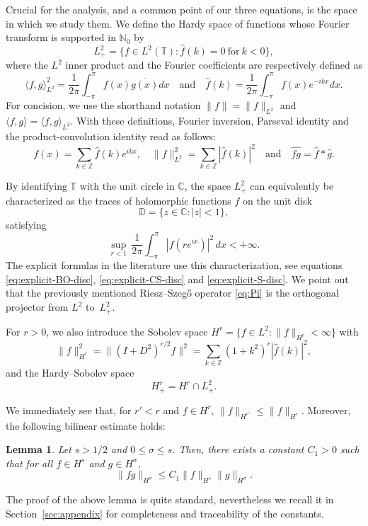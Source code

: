 \documentclass [11pt] {article}
\newtheorem{lem}[thm]{Lemma}
\begin{document}
Crucial for the analysis, and a common point of our three equations, is the space in which we study them. We define the Hardy space of functions whose Fourier transform is supported in $\mathbb N_0$ by
\begin{equation}
\label{eq:Hardy}
L^2_{+} = \{f\in L^2(\mathbb{T}) : \widehat{f}(k) = 0 \ \text{for} \ k<0 \},
\end{equation}
where the $L^2$ inner product and the Fourier coefficients are respectively defined as
\[
\langle f,g\rangle_{L^2}^2=\frac{1}{2\pi}\int_{-\pi}^\pi f(x)\overline{g(x)}dx\quad\text{and}\quad \widehat f(k)=\frac{1}{2\pi}\int_{-\pi}^\pi f(x)e^{-ikx}dx.
\]
For concision, we use the shorthand notation $\|f\|=\|f\|_{L^2}$ and $\langle f,g\rangle=\langle f,g\rangle_{L^2}$. With these definitions, Fourier inversion, Parseval identity and the product-convolution identity read as follows:
\[
f(x)=\sum_{k\in\mathbb Z}\widehat f(k) e^{ikx},\quad \|f\|_{L^2}^2=\sum_{k\in \mathbb Z} |\widehat f(k)|^2\quad\text{and}\quad \widehat{fg}=\widehat f*\widehat g.
\]

By identifying $\mathbb T$ with the unit circle in $\mathbb C$, the space $L^2_+$ can equivalently be characterized as the traces of holomorphic functions $f$ on the unit disk
\[
\mathbb{D} = \{z\in \mathbb{C} : |z| <1 \},
\]
satisfying
\[
\sup_{r<1}\,\frac{1}{2\pi}\int_{-\pi}^{\pi} |f(re^{ix})|^2\,dx < + \infty.
\]
The explicit formulas in the literature use this characterization, see equations \eqref{eq:explicit-BO-disc}, \eqref{eq:explicit-CS-disc} and \eqref{eq:explicit-S-disc}.
We point out that the previously mentioned Riesz–Szeg\H o operator \eqref{eq:Pi} is the orthogonal projector from $L^2$ to~$L^2_{+}$.

For $r>0$, we also introduce the Sobolev space $H^r=\{f\in L^2 : \|f\|_{H^r}<\infty\}$ with
\[
\|f\|_{H^r}^2=\|(I+D^2)^{r/2}f\big\|^2=\sum_{k\in \mathbb Z}(1+k^2)^{r}|\widehat f(k)|^2,
\]
and the Hardy–Sobolev space 
\begin{equation}
\label{eq:HardySobolev}
H^r_{+} = H^r\cap L^2_{+}.
\end{equation}

We immediately see that, for $r'<r$ and $f\in H^r$, $\|f\|_{H^{r'}}\leq \|f\|_{H^r}$. Moreover, the following bilinear estimate holds:
\begin{lem}
\label{lem:bilinear}
Let $s> 1/2$ and $0\le\sigma\leq s$. Then, there exists a constant $C_1 > 0$ such that for all $f\in H^s$ and $g\in H^\sigma$,
\[
\|fg\|_{H^\sigma}\leq C_1\|f\|_{H^s}\|g\|_{H^\sigma}.
\]
\end{lem}
The proof of the above lemma is quite standard, nevertheless we recall it in Section~\ref{sec:appendix} for completeness and traceability of the constants.
\end{document}

